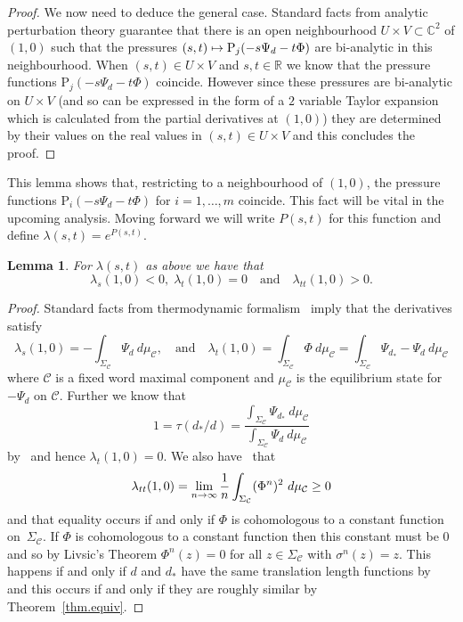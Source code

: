 \documentclass[10pt]{amsart}
\newtheorem{lemm}[theo]{Lemma}\newtheorem{prop}[theo]{Proposition}\newtheorem{coro}[theo]{Corollary}\newtheorem{conj}[theo]{Conjecture}
\theoremstyle{definition}\newtheorem{defi}[theo]{Definition}\newtheorem{rema}[theo]{Remark}\newtheorem{exam}[theo]{Example}\newtheorem{exem}[theo]{Example}\newtheorem{nota}[theo]{Notation}
\renewcommand{\P}{\Psi}
\newcommand{\Cc}{\mathcal{C}}
\newcommand{\C}{\mathbb{C}}
\newcommand{\R}{\mathbb{R}}
\newcommand*\rmP{\mathrm{P}}
\renewcommand*{\to}{\mathchoice{\longrightarrow}{\rightarrow}{\rightarrow}{\rightarrow}}
\let\oldmapsto\mapsto
\renewcommand*{\mapsto}{\mathchoice{\longmapsto}{\oldmapsto}{\oldmapsto}{\oldmapsto}}
\newcounter{setofcase}
\newcounter{case}[setofcase]
\theoremstyle{plain}
\begin{document}
\begin{proof}
We now need to deduce the general case. Standard facts from analytic perturbation theory guarantee that there is an open neighbourhood $U \times V \subset \C^2$ of $(1,0)$ such that the pressures $(s,t) \mapsto \rmP_j(-s\Psi_d - t\Phi)$ are bi-analytic in this neighbourhood. When $(s,t) \in U \times V$ and $s,t\in \R$ we know that the pressure functions $\rmP_j(-s\Psi_d - t\Phi)$ coincide. However since these pressures are bi-analytic on $U \times V$ (and so can be expressed in the form of a $2$ variable Taylor expansion which is calculated from the partial derivatives at $(1,0)$) they are determined by their values on the real values in $(s,t) \in U \times V$ and this concludes the proof.
\end{proof}

This lemma shows that, restricting to a neighbourhood of $(1,0)$, the pressure functions $\rmP_i(-s\Psi_d - t\Phi)$ for $i=1,\dots, m$ coincide. This fact will be vital in the upcoming analysis. Moving forward we will write $P(s,t)$ for this function and define $\lambda(s,t) = e^{P(s,t)}$.

\begin{lemm}\label{lem.deriv}
For $\lambda(s,t)$ as above we have that
\[
\lambda_{s}(1,0) < 0, \; \lambda_{t}(1,0) = 0 \quad\text{and}\quad  \lambda_{t t}(1,0) > 0.
\]
\end{lemm}

\begin{proof}
Standard facts from thermodynamic formalism~\cite{ParryPollicott} imply that the derivatives satisfy
\[
\lambda_s(1,0) = -\int_{\Sigma_\Cc} \Psi_d \ d\mu_{\Cc}, \quad\text{and}\quad \lambda_t(1,0) = \int_{\Sigma_\Cc} \Phi \ d\mu_{\Cc} = \int_{\Sigma_\Cc} \Psi_{d_\ast} - \Psi_d \ d\mu_{\Cc}
\]
where $\Cc$ is a fixed word maximal component and $\mu_\Cc$ is the equilibrium state for $-\Psi_d$ on $\Cc$. Further we know that
\[
1 = \tau(d_\ast/d) = \frac{ \int_{\Sigma_\Cc} \P_{d_\ast} \ d\mu_\Cc}{\int_{\Sigma_\Cc} \P_{d} \ d\mu_\Cc}
\]
by~\cite[Theorem~5.4]{cantrell.tanaka.2} and hence $\lambda_t(1,0) = 0$. We also have~\cite{ParryPollicott} that
\[
\lambda_{t t}(1,0) = \lim_{n\to\infty} \frac{1}{n} \int_{\Sigma_\Cc} (\Phi^n)^2 \ d\mu_{\Cc} \ge 0
\]
and that equality occurs if and only if $\Phi$ is cohomologous to a constant function on~$\Sigma_\Cc$. If $\Phi$ is cohomologous to a constant function then this constant must be $0$ and so by Livsic's Theorem $\Phi^n(z) = 0$ for all $z \in \Sigma_\Cc$ with $\sigma^n(z) = z$. This happens if and only if $d$ and $d_\ast$ have the same translation length functions by~\cite[Corollary~3.6]{cantrell} and this occurs if and only if they are roughly similar by Theorem~\ref{thm.equiv}.
\end{proof}
\end{document}
